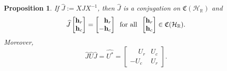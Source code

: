 \documentclass{dis}
\newcommand{\phm}{\phantom{-}}
\theoremstyle{plain}
\newtheorem{Proposition}[equation]{Proposition}
\theoremstyle{definition}
\def\R{\mathbb{R}}
\renewcommand{\vec}[1]{{\bf #1}}
\newcommand{\0}{{\color{lightgray}0}}
\begin{document}
\begin{Proposition}\label{Jayyyyhat}
If $\widehat{J} := X J X^{-1}$, then $\widehat{J}$ is a conjugation on $\mathfrak{C}(\mathcal{H}_{\R})$ and
$$\widehat{J}\begin{bmatrix}\vec{h}_{r}\\ \vec{h}_{c}\end{bmatrix} = \begin{bmatrix}\phantom{-}\vec{h}_{r}\\ -\vec{h}_{c}\end{bmatrix} \; \; \mbox{for all} \; \;  \begin{bmatrix}\vec{h}_{r}\\ \vec{h}_{c}\end{bmatrix} \in \mathfrak{C}(\mathcal{H}_{\R}).$$ Moreover,
$$\widehat{J} \widehat{U} \widehat{J} = \widehat{U^{*}} =  \begin{bmatrix}\phm U_{r} & U_{c}\\ -U_{c} & U_{r}\end{bmatrix}.$$
\end{Proposition}
\end{document}
